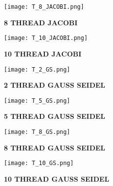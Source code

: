 \documentclass{article}
\begin{document}
\newpage

\begin{figure}[htpb!]
     \centering

    \texttt{[image: T\_8\_JACOBI.png]}
    \caption{ \textbf{8 THREAD JACOBI}}

        \texttt{[image: T\_10\_JACOBI.png]}
    \caption{ \textbf{10 THREAD JACOBI}}
  \end{figure} 

\newpage
    
  
  \begin{figure}[htpb!]
     \centering

    \texttt{[image: T\_2\_GS.png]}
    \caption{ \textbf{2 THREAD GAUSS SEIDEL}}

        \texttt{[image: T\_5\_GS.png]}
    \caption{ \textbf{5 THREAD GAUSS SEIDEL}}
  \end{figure} 

\newpage

\begin{figure}[htpb!]
     \centering

    \texttt{[image: T\_8\_GS.png]}
    \caption{ \textbf{8 THREAD GAUSS SEIDEL}}

        \texttt{[image: T\_10\_GS.png]}
    \caption{ \textbf{10 THREAD GAUSS SEIDEL}}
  \end{figure} 
\end{document}

